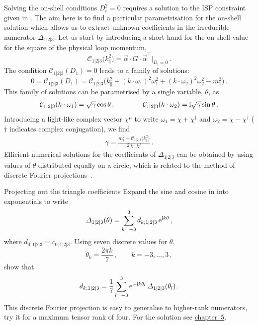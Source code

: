Solving the on-shell conditions $D_i^2=0$ requires a solution to the ISP
constraint given in . The aim here is to find a particular
parametrisation for the on-shell solution which allows us to extract unknown
coefficients in the irreducible numerator $\Delta_{1|2|3}$. Let us start by introducing a short hand for the on-shell value for
the square of the physical loop momentum,
\begin{equation}
  \mathcal{C}_{1|2|3}\bigl(k_{\parallel}^2\bigr) = \vec{\alpha} \cdot G \cdot \vec{\alpha}^{\top} \bigl|_{D_i=0} \,.
\end{equation}
The condition $\mathcal{C}_{1|2|3}(D_1) = 0$ leads to a family of solutions:
\begin{equation}
  0 = \mathcal{C}_{1|2|3}(D_1) = \mathcal{C}_{1|2|3}\bigl(k_{\parallel}^2 + (k\cdot\omega_1)^2 \omega_1^2 + (k\cdot\omega_2)^2 \omega_2^2 - m_1^2 \bigr) \,.
\end{equation}
This family of solutions can be parametrised by a single variable, $\theta$, as
\begin{align}
  \mathcal{C}_{1|2|3} (k\cdot\omega_1) = \sqrt{\gamma} \cos\theta \,, \qquad \qquad
  \mathcal{C}_{1|2|3} (k\cdot\omega_2) = \mathrm{i} \sqrt{\gamma} \sin\theta \,.
  \label{eq:kwparam}
\end{align}
Introducing a light-like complex vector $\chi^\mu$ to write $\omega_1 = \chi +
\chi^\dagger$ and $\omega_2 = \chi - \chi^\dagger$ ($\dagger$ indicates complex conjugation), we find 
\begin{align}
\gamma = \frac{m_1^2 - \mathcal{C}_{1|2|3}\bigl(k_{\parallel}^2 \bigr)}{2 \, \chi\cdot\chi^\dagger} \,.
\end{align}
Efficient numerical solutions for the coefficients of $\Delta_{1|2|3}$ can be obtained by using values of
$\theta$ distributed equally on a circle, which is related to the method of
discrete Fourier projections~\cite{ch3_Berger:2008sj,ch3_Mastrolia:2008jb}.

\begin{exer}{Projecting out the triangle coefficients}
\label{Ex:3.7}
Expand the sine and cosine in  into exponentials to write
\begin{equation} \label{eq:Delta123exp}
  \Delta_{1|2|3}(\theta) = \sum_{k=-3}^3 d_{k;1|2|3} \, \mathrm{e}^{\i k \theta} \,,
\end{equation}
where $d_{0;1|2|3} = c_{0;1|2|3}$. Using seven discrete values for $\theta$,
\begin{equation} \label{eq:thetak}
  \theta_k = \frac{2\pi k}{7}\,, \qquad k=-3,\ldots,3\,,
\end{equation}
show that
\begin{equation} \label{eq:d123fourier}
  d_{k;1|2|3} = \frac{1}{7} \sum_{l=-3}^{3} \mathrm{e}^{-\i k \theta_l} \, \Delta_{1|2|3}(\theta_l) \,.
\end{equation}
This discrete Fourier projection is easy to generalise to higher-rank numerators, try it for a maximum tensor rank of four.
For the solution see \hyperref[Sol:3.7]{chapter~5}.
\end{exer}

